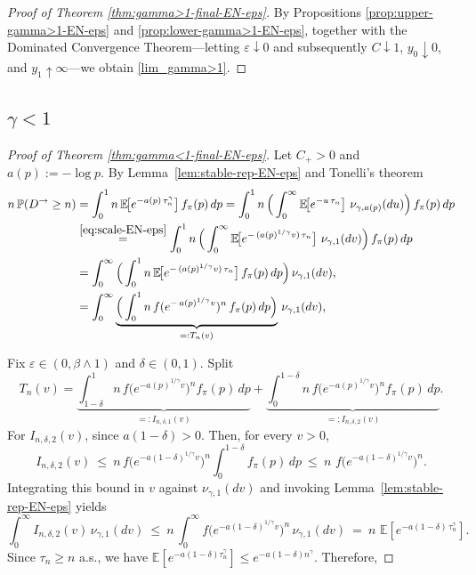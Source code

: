 \documentclass[preprint]{imsart}
\newcommand{\PP}{\mathbb{P}}
\newcommand{\EE}{\mathbb{E}}
\newcommand{\1}{\mathbf{1}}
\theoremstyle{plain}
\theoremstyle{definition}
\begin{document}
\begin{proof}[Proof of Theorem \ref{thm:gamma>1-final-EN-eps}] By Propositions \ref{prop:upper-gamma>1-EN-eps} and \ref{prop:lower-gamma>1-EN-eps}, together with the Dominated Convergence Theorem---letting \(\varepsilon \downarrow 0\) and subsequently \(C \downarrow 1\), \(y_0 \downarrow 0\), and \(y_1 \uparrow \infty\)---we obtain \eqref{lim_gamma>1}.

\end{proof}


\subsection{$\gamma<1$}\label{sec:gamma<1}

\begin{proof}[Proof of Theorem \ref{thm:gamma<1-final-EN-eps}]
Let \(C_{+}>0\) and \(a(p):=-\log p\). By Lemma~\ref{lem:stable-rep-EN-eps} and Tonelli’s theorem 
\[
\begin{aligned}
n\,\PP(D^{\rightarrow}\ge n)
&=\int_0^1 n\,\EE\!\big[e^{-a(p)\,\tau_n^\gamma}\big]\, f_\pi(p)\,dp
=\int_0^1 n\,\Big(\int_0^\infty \EE\!\big[e^{-u\,\tau_n}\big]\ \nu_{\gamma,a(p)}(du)\Big)\, f_\pi(p)\,dp\\
&\stackrel{\eqref{eq:scale-EN-eps}}{=}\int_0^1 n\,\Big(\int_0^\infty \EE\!\big[e^{-\,(a(p)^{1/\gamma}v)\,\tau_n}\big]\ \nu_{\gamma,1}(dv)\Big)\, f_\pi(p)\,dp\\
&=\int_0^\infty \Big(\int_0^1 n\,\EE\!\big[e^{-\,(a(p)^{1/\gamma}v)\,\tau_n}\big]\, f_\pi(p)\,dp\Big)\,\nu_{\gamma,1}(dv),\\
&=\int_0^\infty \underbrace{\Big(\int_0^1 n\,f(e^{-\,a(p)^{1/\gamma}v})^{n}\, f_\pi(p)\,dp\Big)}_{=:T_n(v)}\,\nu_{\gamma,1}(dv),
\end{aligned}
\]

Fix \(\varepsilon\in(0,\beta\wedge1)\) and  \(\delta\in (0,1)\). Split
\[
T_n(v)=\underbrace{\int_{1-\delta}^1 n\, f\!\big(e^{-a(p)^{1/\gamma}v}\big)^{n} f_\pi(p)\,dp}_{=:I_{n,\delta,1}(v)}
+\underbrace{\int_0^{1-\delta} n\, f\!\big(e^{-a(p)^{1/\gamma}v}\big)^{n} f_\pi(p)\,dp}_{=:I_{n,\delta,2}(v)}.
\]
For \(I_{n,\delta,2}(v)\), since \(a(1-\delta)>0\). Then, for every \(v>0\),
\[
I_{n,\delta,2}(v)\ \le\ n\, f\!\big(e^{-a(1-\delta)^{1/\gamma}v}\big)^{\!n} \int_0^{1-\delta} f_\pi(p)\,dp
\ \le\ n\,\, f\!\big(e^{-a(1-\delta)^{1/\gamma}v}\big)^{n}.
\]
Integrating this bound in \(v\) against \(\nu_{\gamma,1}(dv)\) and invoking Lemma~\ref{lem:stable-rep-EN-eps} yields
\begin{equation}\label{eq:I2-small-integrated}
\int_0^\infty I_{n,\delta,2}(v)\,\nu_{\gamma,1}(dv)
\ \le\ n\, \int_0^\infty f\!\big(e^{-a(1-\delta)^{1/\gamma}v}\big)^{n}\,\nu_{\gamma,1}(dv)
\ =\ n\,\,\EE\!\left[e^{-a(1-\delta)\,\tau_n^{\gamma}}\right].
\end{equation}
Since \(\tau_n\ge n\) a.s., we have \(\EE[e^{-a(1-\delta) \tau_n^\gamma}]\le e^{-a(1-\delta) n^\gamma}\). Therefore,


\end{proof}
\end{document}
